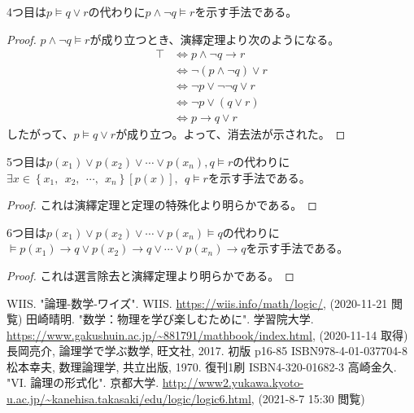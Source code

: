 \documentclass[a4paper]{jsarticle}
\begin{document}
\begin{thm}[消去法]
\label{1.1.1.13}
4つ目は$p \vDash q \vee r$の代わりに$p \land \neg q \vDash r$を示す手法である。
\end{thm}
\begin{proof}
$p \land \neg q \vDash r$が成り立つとき、演繹定理より次のようになる。
\begin{align*}
\top &\Leftrightarrow p \land \neg q \rightarrow r \\
&\Leftrightarrow \neg(p \land \neg q) \vee r \\
&\Leftrightarrow \neg p \vee \neg\neg q \vee r \\
&\Leftrightarrow \neg p \vee (q \vee r) \\
&\Leftrightarrow p \rightarrow q \vee r
\end{align*}
したがって、$p \vDash q \vee r$が成り立つ。よって、消去法が示された。
\end{proof}
\begin{thm}[場合分け論法]
\label{1.1.1.14}
5つ目は$p\left( x_{1} \right) \vee p\left( x_{2} \right) \vee \cdots \vee p\left( x_{n} \right),q \vDash r$の代わりに$\exists x \in \left\{ x_{1},\ \ x_{2},\ \ \cdots,\ \ x_{n} \right\}\left[ p(x) \right],\ \ q \vDash r$を示す手法である。
\end{thm}
\begin{proof}
これは演繹定理と定理の特殊化より明らかである。
\end{proof}
\begin{thm}[総当たり法]
\label{1.1.1.15}
6つ目は$p\left( x_{1} \right) \vee p\left( x_{2} \right) \vee \cdots \vee p\left( x_{n} \right) \vDash q$の代わりに$\vDash p\left( x_{1} \right) \rightarrow q \vee p\left( x_{2} \right) \rightarrow q \vee \cdots \vee p\left( x_{n} \right) \rightarrow q$を示す手法である。
\end{thm}
\begin{proof}
これは選言除去と演繹定理より明らかである。
\end{proof}
\begin{thebibliography}{50}
  WIIS. "論理-数学-ワイズ". WIIS. \url{https://wiis.info/math/logic/}, (2020-11-21 閲覧)
  田崎晴明. "数学：物理を学び楽しむために". 学習院大学. \url{https://www.gakushuin.ac.jp/~881791/mathbook/index.html}, (2020-11-14 取得)
  長岡亮介, 論理学で学ぶ数学, 旺文社, 2017. 初版 p16-85 ISBN978-4-01-037704-8
  松本幸夫, 数理論理学, 共立出版, 1970. 復刊1刷 ISBN4-320-01682-3
  高崎金久. "VI. 論理の形式化". 京都大学. \url{http://www2.yukawa.kyoto-u.ac.jp/~kanehisa.takasaki/edu/logic/logic6.html}, (2021-8-7 15:30 閲覧)
\end{thebibliography}
\end{document}
